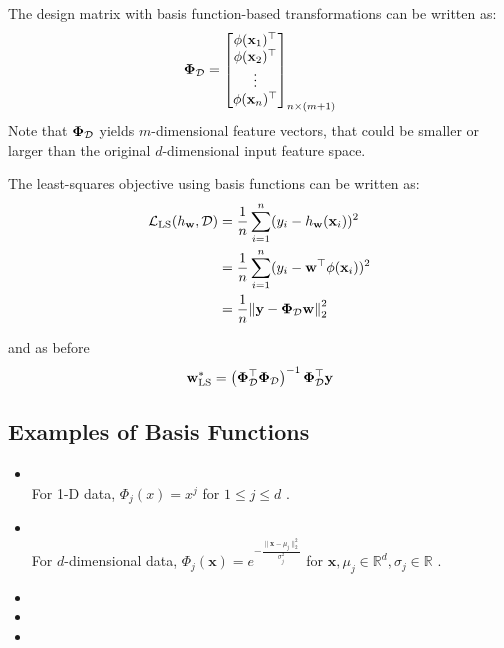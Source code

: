 The design matrix with basis function-based transformations can be written as:
\begin{align*}
  \mathbf{\Phi}_{\mathcal{D}} =
  \begin{bmatrix}
    \phi(\mathbf{x}_1)^\top \\
    \phi(\mathbf{x}_2)^\top \\
    \vdots          \\
    \phi(\mathbf{x}_n)^\top
  \end{bmatrix}_{n\times(m + 1)}
\end{align*}
Note that $\mathbf{\Phi}_{\mathcal{D}}$ yields $m$-dimensional feature vectors, that could be smaller or larger than the original $d$-dimensional input feature space.

The least-squares objective using basis functions can be written as:
\begin{align*}
  \mathcal{L}_{\text{LS}}(h_\mathbf{w}, \mathcal{D}) & = \dfrac{1}{n}\sum_{i = 1}^n(y_i - h_\mathbf{w}(\mathbf{x}_i))^2           \\
                                            & = \dfrac{1}{n}\sum_{i = 1}^n(y_i - \mathbf{w}^\top\phi(\mathbf{x}_i))^2    \\
                                            & = \dfrac{1}{n}\norm{ \mathbf{y} - \mathbf{\Phi}_{\mathcal{D}}\mathbf{w} }_2^2
\end{align*}

and as before
\begin{align*}
  \mathbf{w}^*_{\text{LS}} = \left(\mathbf{\Phi}_{\mathcal{D}}^\top\mathbf{\Phi}_{\mathcal{D}}\right)^{-1}\mathbf{\Phi}_{\mathcal{D}}^\top\mathbf{y}
\end{align*}

\newpage
\subsection{Examples of Basis Functions}
\begin{itemize}
  \item {}\\ For 1-D data, \(\Phi_j(x) = x^j\) for \(1 \leq j \leq d\) .
  \item {}\\
        For $d$-dimensional data, \(\Phi_j(\mathbf{x}) = e^{-\frac{\|\mathbf{x}-\mu_j\|_2^2}{\sigma_j^2}}\) for \(\mathbf{x},\mu_j \in \mathbb{R}^d, \sigma_j \in \mathbb{R}\) .
  \item {}
  \item {}
  \item {}
\end{itemize}

